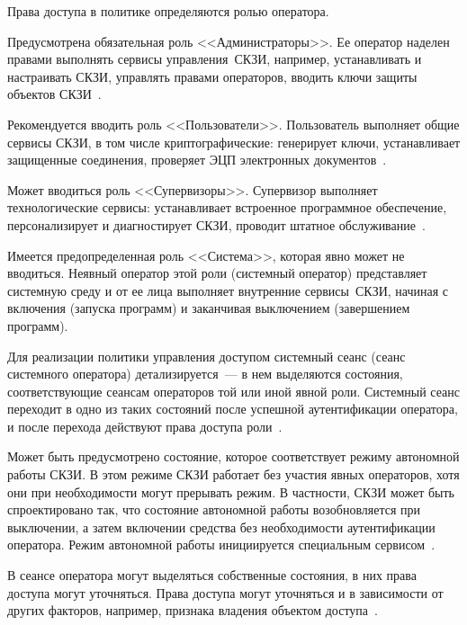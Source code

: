 Права доступа в политике определяются ролью оператора. 

Предусмотрена обязательная роль <<Администраторы>>. 
Ее оператор наделен правами выполнять сервисы управления~СКЗИ, например, 
устанавливать и настраивать СКЗИ, управлять правами операторов, 
вводить ключи защиты объектов СКЗИ~.

Рекомендуется вводить роль <<Пользователи>>. Пользователь выполняет общие
сервисы СКЗИ, в том числе криптографические: генерирует ключи, устанавливает
защищенные соединения, проверяет ЭЦП электронных 
документов~.

Может вводиться роль <<Супервизоры>>. 
Супервизор выполняет технологические сервисы: 
устанавливает встроенное программное обеспечение,
персонализирует и диагностирует СКЗИ, проводит штатное 
обслуживание~.

Имеется предопределенная роль <<Система>>, которая явно может не вводиться.
%
Неявный оператор этой роли (системный оператор) представляет 
системную среду и от ее лица выполняет внутренние сервисы~СКЗИ, 
начиная с включения (запуска программ) и заканчивая выключением 
(завершением программ).
%

Для реализации политики управления доступом системный сеанс 
(сеанс системного оператора) детализируется~--- в нем 
выделяются состояния, соответствующие сеансам операторов той или иной явной 
роли. 
%
Системный сеанс переходит в одно из таких состояний после успешной 
аутентификации оператора, и после перехода действуют права доступа 
роли~. 

Может быть предусмотрено состояние, которое соответствует режиму автономной
работы СКЗИ. В этом режиме СКЗИ работает без участия явных операторов, хотя они
при необходимости могут прерывать режим. В частности, СКЗИ может быть
спроектировано так, что состояние автономной работы возобновляется при
выключении, а затем включении средства без необходимости аутентификации
оператора.
%
Режим автономной работы инициируется специальным сервисом~. 

В сеансе оператора могут выделяться собственные состояния, в них права  
доступа могут уточняться. 
%
Права доступа могут уточняться и в зависимости от других факторов,
например, признака владения объектом доступа~.

